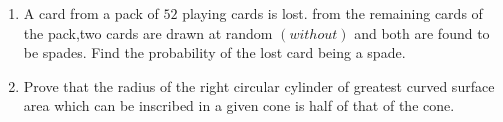 \documentclass[12pt,-letter paper]{article}
\providecommand{\brak}[1]{\ensuremath{\left(#1\right)}}
\begin{document}
\begin{enumerate}
\item A card from a pack of $52$  playing cards is lost. from the remaining cards of the pack,two cards are drawn at random $\brak{without}$ and both are found to be spades. Find the probability of the lost card being a spade. 
\item Prove that the radius of the right circular cylinder of greatest curved surface area which can be inscribed in a given cone is half of that of the cone.
\end{enumerate}
\end{document}
